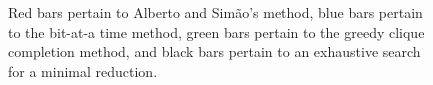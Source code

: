 \begin{figure}
\caption{\emph{} {Red} bars pertain to Alberto and Sim\~ao's method, 
{blue} bars pertain to the bit-at-a time method, 
{green} bars pertain to the greedy clique completion method, 
and
{black} bars pertain to an exhaustive search for a minimal reduction.
}
\end{figure}
